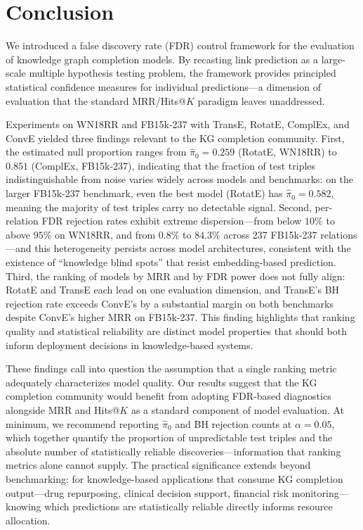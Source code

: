 \section{Conclusion}
\label{sec:conclusion}

We introduced a false discovery rate (FDR) control framework for the evaluation of knowledge graph completion models.
By recasting link prediction as a large-scale multiple hypothesis testing problem, the framework provides principled statistical confidence measures for individual predictions---a dimension of evaluation that the standard MRR/Hits@$K$ paradigm leaves unaddressed.

Experiments on WN18RR and FB15k-237 with TransE, RotatE, ComplEx, and ConvE yielded three findings relevant to the KG completion community.
First, the estimated null proportion ranges from $\hat{\pi}_0 = 0.259$ (RotatE, WN18RR) to $0.851$ (ComplEx, FB15k-237), indicating that the fraction of test triples indistinguishable from noise varies widely across models and benchmarks: on the larger FB15k-237 benchmark, even the best model (RotatE) has $\hat{\pi}_0 = 0.582$, meaning the majority of test triples carry no detectable signal.
Second, per-relation FDR rejection rates exhibit extreme dispersion---from below $10\%$ to above $95\%$ on WN18RR, and from $0.8\%$ to $84.3\%$ across 237 FB15k-237 relations---and this heterogeneity persists across model architectures, consistent with the existence of ``knowledge blind spots'' that resist embedding-based prediction.
Third, the ranking of models by MRR and by FDR power does not fully align: RotatE and TransE each lead on one evaluation dimension, and TransE's BH rejection rate exceeds ConvE's by a substantial margin on both benchmarks despite ConvE's higher MRR on FB15k-237. This finding highlights that ranking quality and statistical reliability are distinct model properties that should both inform deployment decisions in knowledge-based systems.

These findings call into question the assumption that a single ranking metric adequately characterizes model quality.
Our results suggest that the KG completion community would benefit from adopting FDR-based diagnostics alongside MRR and Hits@$K$ as a standard component of model evaluation.
At minimum, we recommend reporting $\hat{\pi}_0$ and BH rejection counts at $\alpha = 0.05$, which together quantify the proportion of unpredictable test triples and the absolute number of statistically reliable discoveries---information that ranking metrics alone cannot supply.
The practical significance extends beyond benchmarking: for knowledge-based applications that consume KG completion output---drug repurposing, clinical decision support, financial risk monitoring---knowing which predictions are statistically reliable directly informs resource allocation.

